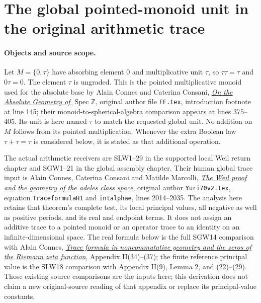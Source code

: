 \section{The global pointed-monoid unit in the original arithmetic trace}
\label{sec:FTR-unittrace}

\paragraph{Objects and source scope.}
Let $M=\{0,\tau\}$ have absorbing element $0$ and multiplicative
unit $\tau$, so $\tau\tau=\tau$ and $0\tau=0$.
The element $\tau$ is ungraded. This is the pointed multiplicative
monoid used for the absolute base by Alain Connes and Caterina
Consani, \href{https://arxiv.org/abs/2606.06604v1}{\emph{On the
Absolute Geometry of $\operatorname{Spec}\mathbb Z$}}, original
author file \nolinkurl{FF.tex}, introduction footnote at line 145;
their monoid-to-spherical-algebra comparison appears at lines
375--405. Its unit is here named $\tau$ to match the requested
global unit. No addition on $M$ follows from its pointed
multiplication. Whenever the extra Boolean law
$\tau+\tau=\tau$ is considered below, it is stated as that
additional operation.

The actual arithmetic receivers are SLW1--29 in the supported
local Weil return chapter and SGW1--21 in the global assembly
chapter.
Their human global trace input is Alain Connes, Caterina Consani
and Matilde Marcolli,
\href{https://arxiv.org/abs/math/0703392v1}{\emph{The Weil proof
and the geometry of the adeles class space}}, original author
\nolinkurl{Yuri70v2.tex}, equation \texttt{TraceformulaH1} and
\texttt{intalphae}, lines 2014--2035.
The analysis here retains that theorem's complete test, its local
principal values, all negative as well as positive periods, and
its real and endpoint terms. It does not assign an additive trace
to a pointed monoid or an operator trace to an identity on an
infinite-dimensional space.
The real formula below is the full SGW14 comparison with Alain
Connes, \href{https://arxiv.org/abs/math/9811068v1}{\emph{Trace
formula in noncommutative geometry and the zeros of the Riemann
zeta function}}, Appendix II(34)--(37); the finite reference
principal value is the SLW18 comparison with Appendix II(9),
Lemma 2, and (22)--(29). Those existing source comparisons are
the inputs here; this derivation does not claim a new original-source
reading of that appendix or replace its principal-value constants.

